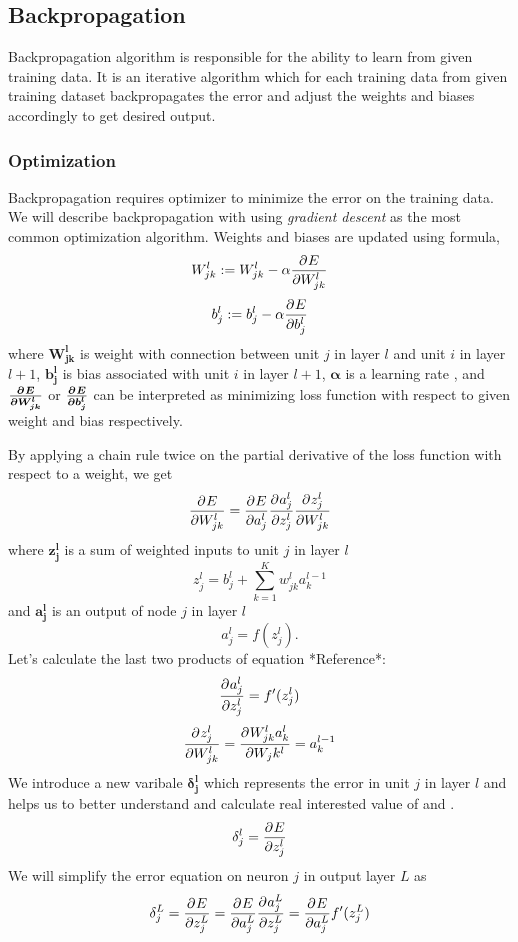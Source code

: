 \subsection{Backpropagation}

Backpropagation algorithm is responsible for the ability to learn from given training data.
It is an iterative algorithm which for each training data %
from given training dataset backpropagates the error and adjust the weights and biases accordingly to get desired output.

\subsubsection{Optimization}

Backpropagation requires optimizer to minimize the error on the training data.
We will describe backpropagation with using \textit{gradient descent} as the most common optimization algorithm.
\newline
Weights and biases are updated using formula,
\[  W_{jk}^l := W_{jk}^l - \alpha\frac{\partial^{} E}{\partial W_{jk}^l} \]
\[ b_j^l := b_j^l - \alpha\frac{\partial^{} E}{\partial b_j^l} \]
where $\boldsymbol{W_{jk}^l}$ is weight with connection between unit $j$ in layer $l$ and unit $i$ in layer $l+1$, $\boldsymbol{b_j^l}$ is bias associated with unit
$i$ in layer $l+1$, $\boldsymbol{\alpha}$ is a learning rate \cite{learning_rate}, and $\boldsymbol{\frac{\partial^{} E}{\partial W_{jk}^l}}$ or $\boldsymbol{\frac{\partial^{} E}{\partial b_j^l}}$ can be interpreted as minimizing loss function with respect to given weight and bias respectively.
\par
By applying a chain rule twice on the partial derivative of the loss function with respect to a weight, we get
\[  \frac{\partial^{} E}{\partial W_{jk}^l} = \frac{\partial^{} E}{\partial a_j^l}\frac{\partial^{} a_j^l}{\partial z_j^l}\frac{\partial^{} z_j^l}{\partial W_{jk}^l} \]
where $\boldsymbol{z_j^l}$ is a sum of weighted inputs to unit $j$ in layer $l$
\[  z_j^l =  b_j^l + \sum_{k=1}^K {w_{jk}^l}{a_k^{l-1}}  \]
and $\boldsymbol{a_j^l}$ is an output of node $j$ in layer $l$
\[  a_j^l =  f(z_j^l).  \]
Let's calculate the last two products of equation *Reference*:
\[  \frac{\partial^{} a_j^l}{\partial z_j^l} = f'(z_j^l)  \]
\[  \frac{\partial^{} z_j^l}{\partial W_{jk}^l} = \frac{\partial^{} W_{jk}^{l}a_k^{l}}{\partial W_jk^l} = a_k^{l-1}  \]
We introduce a new varibale $\boldsymbol{\delta_j^l}$ which represents the error in unit $j$ in layer $l$ and helps us to better understand and calculate real interested value of  and .
\[  \delta_j^l = \frac{\partial^{} E}{\partial z_j^l} \]
We will simplify the error equation on neuron $j$ in output layer $L$ as
\[  \delta_j^L = \frac{\partial^{} E}{\partial z_j^L} = \frac{\partial^{} E}{\partial a_j^L}\frac{\partial^{} a_j^L}{\partial z_j^L} = \frac{\partial^{} E}{\partial a_j^L}f'(z_j^L)\]
